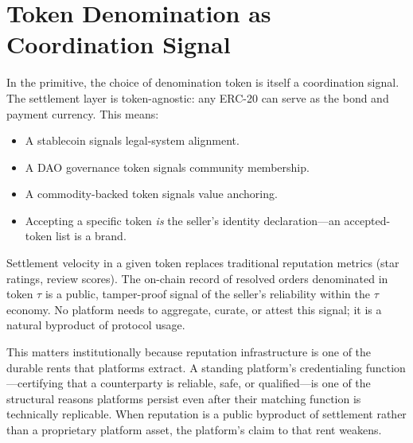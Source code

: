 \documentclass[11pt,a4paper]{article}
\theoremstyle{definition}
\theoremstyle{remark}
\begin{document}
\section{Token Denomination as Coordination Signal}
\label{sec:token}

In the primitive, the choice of denomination token is itself a
coordination signal. The settlement layer is token-agnostic: any
ERC-20 can serve as the bond and payment currency. This means:

\begin{itemize}
  \item A stablecoin signals legal-system alignment.
  \item A DAO governance token signals community membership.
  \item A commodity-backed token signals value anchoring.
  \item Accepting a specific token \emph{is} the seller's identity
    declaration---an accepted-token list is a brand.
\end{itemize}

Settlement velocity in a given token replaces traditional
reputation metrics (star ratings, review scores). The on-chain
record of resolved orders denominated in token $\tau$ is a public,
tamper-proof signal of the seller's reliability within the $\tau$
economy. No platform needs to aggregate, curate, or attest this
signal; it is a natural byproduct of protocol usage.

This matters institutionally because reputation infrastructure is
one of the durable rents that platforms extract. A standing
platform's credentialing function---certifying that a counterparty
is reliable, safe, or qualified---is one of the structural reasons
platforms persist even after their matching function is technically
replicable. When reputation is a public byproduct of settlement
rather than a proprietary platform asset, the platform's claim to
that rent weakens.
\end{document}
